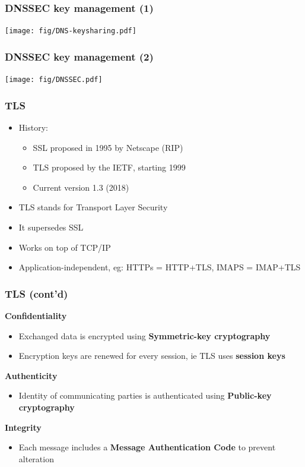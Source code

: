 \documentclass[
hyperref={pdfpagelabels=false}
,xcolor=table
]
{beamer}
\begin{document}
\begin{frame}
  \frametitle{DNSSEC key management (1)}

  \begin{center}
    \texttt{[image: fig/DNS-keysharing.pdf]}
  \end{center}
   
\end{frame}



\begin{frame}
  \frametitle{DNSSEC key management (2)}


  \begin{center}
    \texttt{[image: fig/DNSSEC.pdf]}
  \end{center}
   
\end{frame}


\begin{frame}
  \frametitle{TLS}
  \begin{itemize}
  \item History:
    \begin{itemize}
    \item SSL proposed in 1995 by Netscape (RIP)
    \item TLS proposed by the IETF, starting 1999
    \item Current version 1.3 (2018)
    \end{itemize}
  \item TLS stands for Transport Layer Security
  \item It supersedes SSL 
  \item Works on top of TCP/IP
  \item Application-independent, eg: HTTPs = HTTP+TLS, IMAPS = IMAP+TLS
  \end{itemize}
\end{frame}

\begin{frame}
  \frametitle{TLS (cont'd)}

  \textbf{Confidentiality}
  \begin{itemize}
  \item Exchanged data is encrypted using \textbf{Symmetric-key cryptography}
  \item Encryption keys are renewed for every session, ie TLS uses \textbf{session keys}
  \end{itemize}

  \textbf{Authenticity}
  \begin{itemize}
  \item Identity of communicating parties is authenticated using \textbf{Public-key cryptography}
  \end{itemize}

  \textbf{Integrity}
  \begin{itemize}
  \item Each message includes a \textbf{Message Authentication Code} to prevent alteration
  \end{itemize}
\end{frame}
\end{document}
